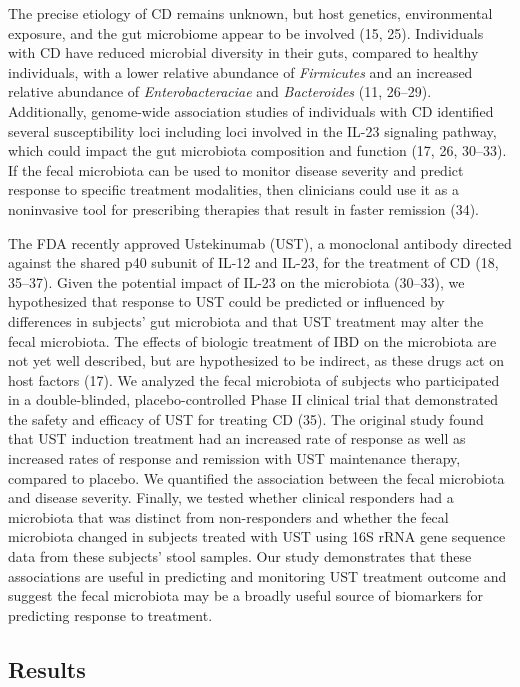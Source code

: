 \documentclass[12pt,]{article}
\begin{document}
The precise etiology of CD remains unknown, but host genetics,
environmental exposure, and the gut microbiome appear to be involved
(15, 25). Individuals with CD have reduced microbial diversity in their
guts, compared to healthy individuals, with a lower relative abundance
of \emph{Firmicutes} and an increased relative abundance of
\emph{Enterobacteraciae} and \emph{Bacteroides} (11, 26--29).
Additionally, genome-wide association studies of individuals with CD
identified several susceptibility loci including loci involved in the
IL-23 signaling pathway, which could impact the gut microbiota
composition and function (17, 26, 30--33). If the fecal microbiota can
be used to monitor disease severity and predict response to specific
treatment modalities, then clinicians could use it as a noninvasive tool
for prescribing therapies that result in faster remission (34).

The FDA recently approved Ustekinumab (UST), a monoclonal antibody
directed against the shared p40 subunit of IL-12 and IL-23, for the
treatment of CD (18, 35--37). Given the potential impact of IL-23 on the
microbiota (30--33), we hypothesized that response to UST could be
predicted or influenced by differences in subjects' gut microbiota and
that UST treatment may alter the fecal microbiota. The effects of
biologic treatment of IBD on the microbiota are not yet well described,
but are hypothesized to be indirect, as these drugs act on host factors
(17). We analyzed the fecal microbiota of subjects who participated in a
double-blinded, placebo-controlled Phase II clinical trial that
demonstrated the safety and efficacy of UST for treating CD (35). The
original study found that UST induction treatment had an increased rate
of response as well as increased rates of response and remission with
UST maintenance therapy, compared to placebo. We quantified the
association between the fecal microbiota and disease severity. Finally,
we tested whether clinical responders had a microbiota that was distinct
from non-responders and whether the fecal microbiota changed in subjects
treated with UST using 16S rRNA gene sequence data from these subjects'
stool samples. Our study demonstrates that these associations are useful
in predicting and monitoring UST treatment outcome and suggest the fecal
microbiota may be a broadly useful source of biomarkers for predicting
response to treatment.

\subsection{Results}\label{results}
\end{document}
